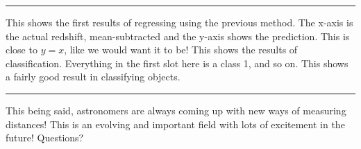 \documentclass[11pt]{article}
\begin{document}
\noindent\rule[0.5ex]{\linewidth}{1pt}

\noindent This shows the first results of regressing using the previous method. The x-axis is the actual redshift, mean-subtracted and the y-axis shows the prediction. This is close to $y=x$, like we would want it to be! This shows the results of classification. Everything in the first slot here is a class 1, and so on. This shows a fairly good result in classifying objects.

\noindent\rule[0.5ex]{\linewidth}{1pt}

\noindent This being said, astronomers are always coming up with new ways of measuring distances! This is an evolving and important field with lots of excitement in the future! Questions?
\end{document}
